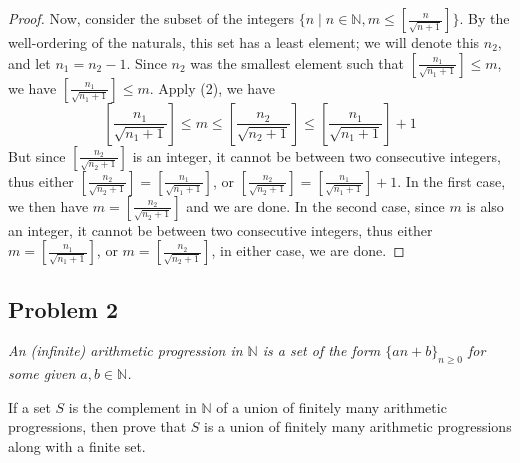 \documentclass{article}
\newcommand{\N}{{\mathbb N}}
\begin{document}
\begin{proof}
	Now, consider the subset of the integers
	$\{n \mid n\in\N, m \leq \left[ \frac{n}{\sqrt{n+1}} \right]\}$.
	By the well-ordering of the naturals, this set has a least element;
	we will denote this $n_2$,
	and let $n_1 = n_2 - 1$.
	Since $n_2$ was the smallest element such that
	$\left[\frac{n_1}{\sqrt{n_1 + 1}}\right] \leq m$,
	we have $\left[\frac{n_1}{\sqrt{n_1 + 1}}\right] \leq m$.
	Apply (2), we have
	\[
		\left[\frac{n_1}{\sqrt{n_1+1}}\right] \leq m
		\leq \left[\frac{n_2}{\sqrt{n_2+1}}\right] \leq \left[\frac{n_1}{\sqrt{n_1+1}}\right] + 1
	\]
	But since $\left[\frac{n_2}{\sqrt{n_2+1}}\right]$ is an integer,
	it cannot be between two consecutive integers,
	thus either $\left[\frac{n_2}{\sqrt{n_2+1}}\right] = \left[\frac{n_1}{\sqrt{n_1+1}}\right]$,
	or $\left[\frac{n_2}{\sqrt{n_2+1}}\right] = \left[\frac{n_1}{\sqrt{n_1+1}}\right] + 1$.
	In the first case, we then have $m = \left[\frac{n_2}{\sqrt{n_2+1}}\right]$ and we are done.
	In the second case,
	since $m$ is also an integer, it cannot be between two consecutive integers,
	thus either $m = \left[\frac{n_1}{\sqrt{n_1+1}}\right]$,
	or $m = \left[\frac{n_2}{\sqrt{n_2+1}}\right]$,
	in either case, we are done.
\end{proof}
\clearpage

\subsection*{Problem 2}
{\it An (infinite) arithmetic progression in $\N$ is a set
of the form $\{an+b\}_{n\geq0}$ for some given $a,b\in\N$.

If a set $S$ is the complement in $\N$ of a union of finitely many arithmetic progressions,
then prove that $S$ is a union of finitely many arithmetic progressions along with a finite set.}
\end{document}
